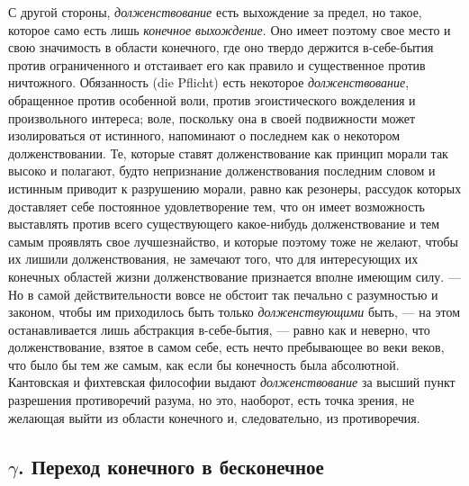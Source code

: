 С другой стороны, {\em долженствование} есть выхождение
за предел, но такое, которое само есть лишь
{\em конечное выхождение}. Оно имеет поэтому свое место
и свою значимость в области конечного, где оно твердо держится в-себе-бытия
против ограниченного и отстаивает его как правило и существенное против
ничтожного. Обязанность (die Pflicht) есть некоторое
{\em долженствование}, обращенное против особенной
воли, против эгоистического вожделения и произвольного интереса; воле,
поскольку она в своей подвижности может изолироваться от истинного,
напоминают о последнем как о некотором долженствовании. Те, которые ставят
долженствование как принцип морали так высоко и полагают, будто непризнание
долженствования последним словом и истинным приводит к разрушению морали,
равно как резонеры, рассудок которых доставляет себе постоянное
удовлетворение тем, что он имеет возможность выставлять против всего
существующего какое-нибудь долженствование и тем самым проявлять свое
лучшезнайство, и которые поэтому тоже не желают, чтобы их лишили
долженствования, не замечают того, что для интересующих их конечных
областей жизни долженствование признается вполне имеющим силу. — Но в самой
действительности вовсе не обстоит так печально с разумностью и законом,
чтобы им приходилось быть только {\em долженствующими}
быть, — на этом останавливается лишь абстракция в-себе-бытия, — равно как и
неверно, что долженствование, взятое в самом себе, есть нечто пребывающее
во веки веков, что было бы тем же самым, как если бы конечность была
абсолютной. Кантовская и фихтевская философии выдают
{\em долженствование} за высший пункт разрешения
противоречий разума, но это, наоборот, есть точка зрения, не желающая выйти
из области конечного и, следовательно, из противоречия.

\subsection*{$\gamma $. Переход конечного в бесконечное}

